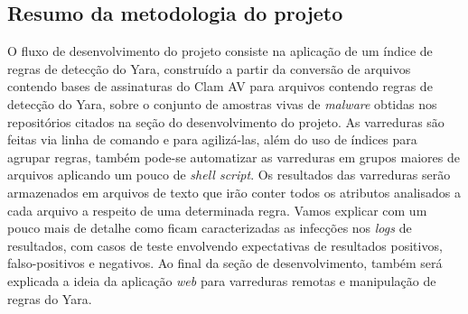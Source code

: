 \subsection{Resumo da metodologia do projeto}
\label{ss.resumo}

O fluxo de desenvolvimento do projeto consiste na aplicação de um índice de
regras de detecção do Yara, construído a partir da conversão de arquivos
contendo bases de assinaturas do Clam AV para arquivos contendo regras de
detecção do Yara, sobre o conjunto de amostras vivas de \textit{malware} obtidas
nos repositórios citados na seção do desenvolvimento do projeto. As varreduras
são feitas via linha de comando e para agilizá-las, além do uso de índices para
agrupar regras, também pode-se automatizar as varreduras em grupos maiores de
arquivos aplicando um pouco de \textit{shell script}. Os resultados das
varreduras serão armazenados em arquivos de texto que irão conter todos os
atributos analisados a cada arquivo a respeito de uma determinada regra. Vamos
explicar com um pouco mais de detalhe como ficam caracterizadas as infecções nos
\textit{logs} de resultados, com casos de teste envolvendo expectativas de
resultados positivos, falso-positivos e negativos. Ao final da seção de
desenvolvimento, também será explicada a ideia da aplicação \textit{web} para
varreduras remotas e manipulação de regras do Yara.
